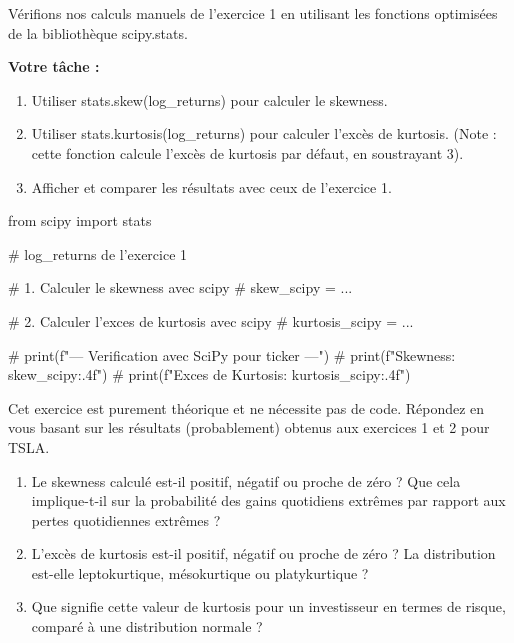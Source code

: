 \begin{exercicebox}
Vérifions nos calculs manuels de l'exercice 1 en utilisant les fonctions optimisées de la bibliothèque scipy.stats.

\textbf{Votre tâche :}
\begin{enumerate}
    \item Utiliser stats.skew(log\_returns) pour calculer le skewness.
    \item Utiliser stats.kurtosis(log\_returns) pour calculer l'excès de kurtosis. (Note : cette fonction calcule l'excès de kurtosis par défaut, en soustrayant 3).
    \item Afficher et comparer les résultats avec ceux de l'exercice 1.
\end{enumerate}

\begin{codecell}
from scipy import stats

# log_returns de l'exercice 1

# 1. Calculer le skewness avec scipy
# skew_scipy = ...

# 2. Calculer l'exces de kurtosis avec scipy
# kurtosis_scipy = ...

# print(f"--- Verification avec SciPy pour {ticker} ---")
# print(f"Skewness: {skew_scipy:.4f}")
# print(f"Exces de Kurtosis: {kurtosis_scipy:.4f}")
\end{codecell}
\end{exercicebox}

\begin{exercicebox}
Cet exercice est purement théorique et ne nécessite pas de code. Répondez en vous basant sur les résultats (probablement) obtenus aux exercices 1 et 2 pour TSLA.

\begin{enumerate}
    \item Le skewness calculé est-il positif, négatif ou proche de zéro ? Que cela implique-t-il sur la probabilité des gains quotidiens extrêmes par rapport aux pertes quotidiennes extrêmes ?
    \item L'excès de kurtosis est-il positif, négatif ou proche de zéro ? La distribution est-elle leptokurtique, mésokurtique ou platykurtique ?
    \item Que signifie cette valeur de kurtosis pour un investisseur en termes de risque, comparé à une distribution normale ?
\end{enumerate}
\end{exercicebox}

